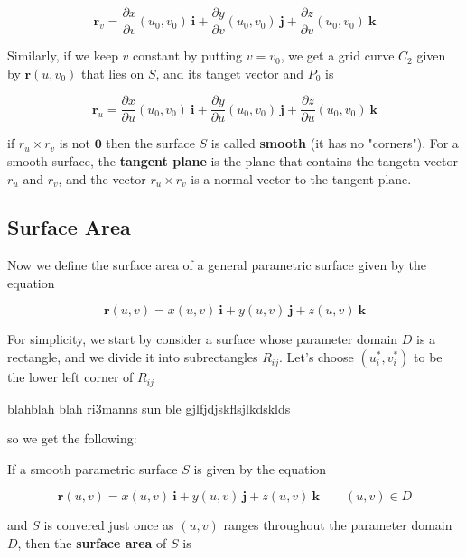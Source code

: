 \documentclass{article}
\begin{document}
\begin{equation*}
    \mathbf{r}_v    = \frac{\partial x}{\partial v}(u_0,v_0) \ \mathbf{i} + \frac{\partial y}{\partial v}(u_0,v_0) \ \mathbf{j} + \frac{\partial z}{\partial v} (u_0, v_0)  \ \mathbf{k}
\end{equation*}

Similarly, if we keep $v$ constant by putting $v = v_0$, we get a grid curve $C_2$ given by $\mathbf{r}(u,v_0)$ that lies on $S$, and its tanget vector and $P_0$ is

\begin{equation*}
    \mathbf{r}_u    = \frac{\partial x}{\partial u}(u_0,v_0) \ \mathbf{i} + \frac{\partial y}{\partial u}(u_0,v_0) \ \mathbf{j} + \frac{\partial z}{\partial u} (u_0, v_0)  \ \mathbf{k}
\end{equation*}

if $r_u \times r_v $ is not $\mathbf{0 }$ then the surface $S$ is called \textbf{smooth} (it has no "corners"). For a smooth surface, the \textbf{tangent plane} is the plane that contains the tangetn vector $r_u$ and $r_v$, and the vector $r_u \times r_v$ is a normal vector to the tangent plane.

\subsection{Surface Area}

Now we define the surface area of a general parametric  surface given by the equation 

\begin{equation*}
    \mathbf{r}(u,v) = x(u,v) \ \mathbf{i} + y(u,v) \ \mathbf{j} + z(u,v) \ \mathbf{k}
\end{equation*}

For simplicity, we start by consider a surface whose parameter domain $D$ is a rectangle, and we divide it into subrectangles $R_{ij}$. Let's choose $(u_i^*, v_i^*)$ to be the lower left corner of $R_{ij}$

blahblah blah ri3manns sun ble gjlfjdjskflsjlkdsklds

so we get the following:

If a smooth parametric surface $S$ is given by the equation 

\begin{equation*}
    \mathbf{r}(u,v) = x(u,v) \ \mathbf{i} + y(u,v) \ \mathbf{j} + z(u,v) \ \mathbf{k} \qquad (u,v) \in D
\end{equation*}

and $S$ is convered just once as $(u,v)$ ranges throughout the parameter domain $D$, then the \textbf{surface area} of $S$ is 
\end{document}

